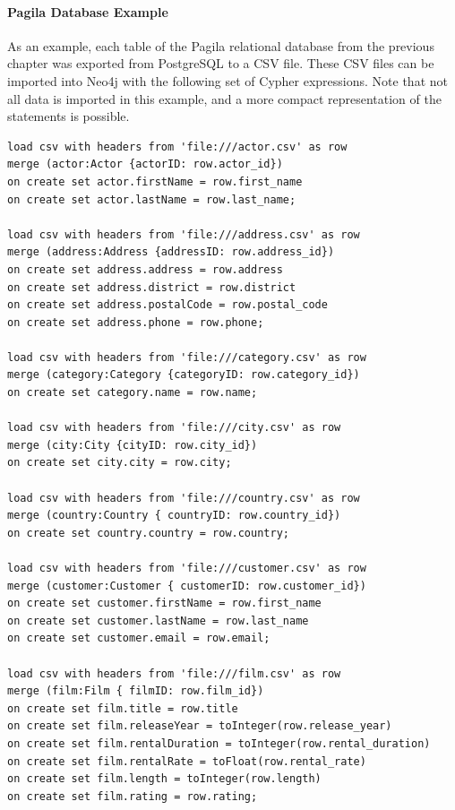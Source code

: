 \begin{withcode}
\paragraph*{Pagila Database Example} As an example, each table of the Pagila relational database from the previous chapter was exported from PostgreSQL to a CSV file. These CSV files can be imported into Neo4j with the following set of Cypher expressions. Note that not all data is imported in this example, and a more compact representation of the statements is possible. 


\FloatBarrier

\footnotesize
\begin{verbatim}
load csv with headers from 'file:///actor.csv' as row 
merge (actor:Actor {actorID: row.actor_id})
on create set actor.firstName = row.first_name 
on create set actor.lastName = row.last_name;

load csv with headers from 'file:///address.csv' as row
merge (address:Address {addressID: row.address_id})
on create set address.address = row.address
on create set address.district = row.district
on create set address.postalCode = row.postal_code
on create set address.phone = row.phone;

load csv with headers from 'file:///category.csv' as row
merge (category:Category {categoryID: row.category_id})
on create set category.name = row.name;

load csv with headers from 'file:///city.csv' as row
merge (city:City {cityID: row.city_id})
on create set city.city = row.city;

load csv with headers from 'file:///country.csv' as row
merge (country:Country { countryID: row.country_id})
on create set country.country = row.country;

load csv with headers from 'file:///customer.csv' as row
merge (customer:Customer { customerID: row.customer_id})
on create set customer.firstName = row.first_name
on create set customer.lastName = row.last_name
on create set customer.email = row.email;

load csv with headers from 'file:///film.csv' as row
merge (film:Film { filmID: row.film_id})
on create set film.title = row.title
on create set film.releaseYear = toInteger(row.release_year)
on create set film.rentalDuration = toInteger(row.rental_duration)
on create set film.rentalRate = toFloat(row.rental_rate)
on create set film.length = toInteger(row.length)
on create set film.rating = row.rating;


\end{verbatim}
\end{withcode}
